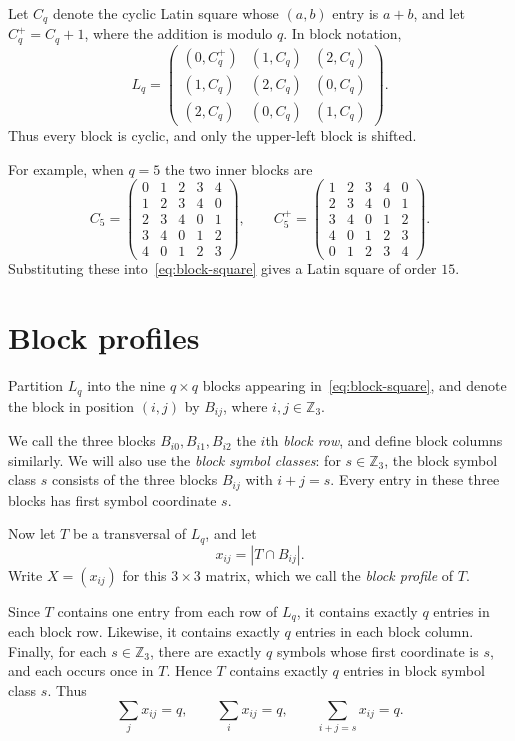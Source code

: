 \documentclass[11pt]{article}
\theoremstyle{remark}
\newcommand{\Z}{\mathbb Z}
\newcommand{\1}{\mathbf 1}
\begin{document}
Let $C_q$ denote the cyclic Latin square whose $(a,b)$ entry is $a+b$, and let $C_q^+=C_q+1$, where the addition is modulo $q$. In block notation,
\begin{equation}\label{eq:block-square}
L_q=
\begin{pmatrix}
 (0,C_q^+) & (1,C_q) & (2,C_q)\\
 (1,C_q)   & (2,C_q) & (0,C_q)\\
 (2,C_q)   & (0,C_q) & (1,C_q)
\end{pmatrix}.
\end{equation}
Thus every block is cyclic, and only the upper-left block is shifted.

For example, when $q=5$ the two inner blocks are
\[
C_5=
\begin{pmatrix}
0&1&2&3&4\\
1&2&3&4&0\\
2&3&4&0&1\\
3&4&0&1&2\\
4&0&1&2&3
\end{pmatrix},
\qquad
C_5^+=
\begin{pmatrix}
1&2&3&4&0\\
2&3&4&0&1\\
3&4&0&1&2\\
4&0&1&2&3\\
0&1&2&3&4
\end{pmatrix}.
\]
Substituting these into~\eqref{eq:block-square} gives a Latin square of order $15$.

\section{Block profiles}

Partition $L_q$ into the nine $q\times q$ blocks appearing in~\eqref{eq:block-square}, and denote the block in position $(i,j)$ by $B_{ij}$, where $i,j\in\Z_3$.

We call the three blocks $B_{i0},B_{i1},B_{i2}$ the $i$th \emph{block row}, and define block columns similarly. We will also use the \emph{block symbol classes}: for $s\in\Z_3$, the block symbol class $s$ consists of the three blocks $B_{ij}$ with $i+j=s$. Every entry in these three blocks has first symbol coordinate $s$.

Now let $T$ be a transversal of $L_q$, and let
\[
x_{ij}=|T\cap B_{ij}|.
\]
Write $X=(x_{ij})$ for this $3\times3$ matrix, which we call the \emph{block profile} of $T$.

Since $T$ contains one entry from each row of $L_q$, it contains exactly $q$ entries in each block row. Likewise, it contains exactly $q$ entries in each block column. Finally, for each $s\in\Z_3$, there are exactly $q$ symbols whose first coordinate is $s$, and each occurs once in $T$. Hence $T$ contains exactly $q$ entries in block symbol class $s$. Thus
\begin{equation}\label{eq:line-sums}
 \sum_jx_{ij}=q,\qquad
 \sum_ix_{ij}=q,\qquad
 \sum_{i+j=s}x_{ij}=q.
\end{equation}
\end{document}
